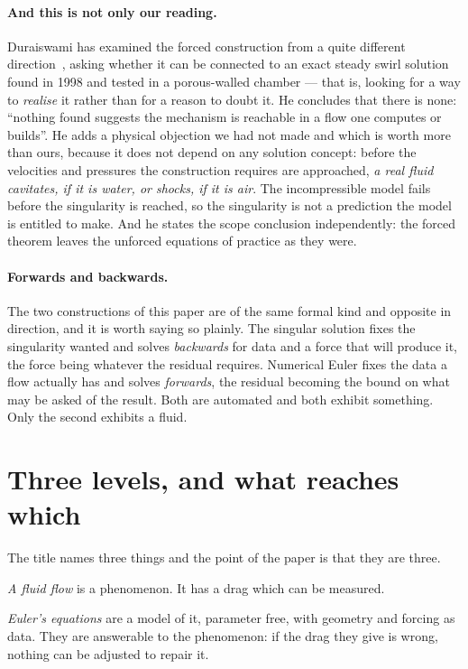 \documentclass[11pt]{article}
\begin{document}
\paragraph{And this is not only our reading.} Duraiswami has examined the forced construction from a
quite different direction~\cite{duraiswami}, asking whether it can be connected to an exact steady
swirl solution found in 1998 and tested in a porous-walled chamber --- that is, looking for a way to
\emph{realise} it rather than for a reason to doubt it. He concludes that there is none:
``nothing found suggests the mechanism is reachable in a flow one computes or builds''. He adds a
physical objection we had not made and which is worth more than ours, because it does not depend on
any solution concept: before the velocities and pressures the construction requires are approached,
\emph{a real fluid cavitates, if it is water, or shocks, if it is air}. The incompressible model
fails before the singularity is reached, so the singularity is not a prediction the model is entitled
to make. And he states the scope conclusion independently: the forced theorem leaves the unforced
equations of practice as they were.

\paragraph{Forwards and backwards.} The two constructions of this paper are of the same formal kind
and opposite in direction, and it is worth saying so plainly. The singular solution fixes the
singularity wanted and solves \emph{backwards} for data and a force that will produce it, the force
being whatever the residual requires. Numerical Euler fixes the data a flow actually has and solves
\emph{forwards}, the residual becoming the bound on what may be asked of the result. Both are
automated and both exhibit something. Only the second exhibits a fluid.

\section{Three levels, and what reaches which}\label{sec:levels}

The title names three things and the point of the paper is that they are three.

\emph{A fluid flow} is a phenomenon. It has a drag which can be measured.

\emph{Euler's equations} are a model of it, parameter free, with geometry and forcing as data. They
are answerable to the phenomenon: if the drag they give is wrong, nothing can be adjusted to repair
it.
\end{document}
